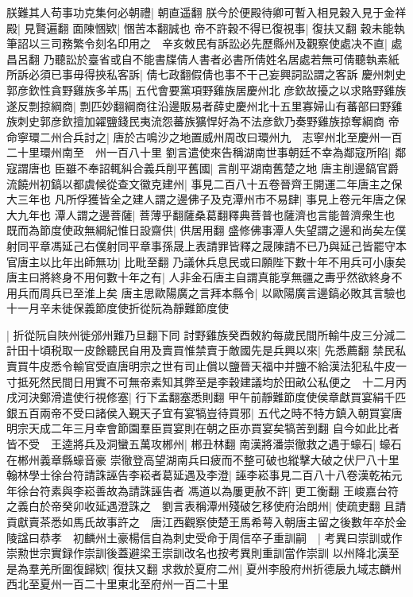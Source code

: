 朕難其人苟事功克集何必朝禮|{
	朝直遥翻}
朕今於便殿待卿可暫入相見穀入見于金祥殿|{
	見賢遍翻}
面陳悃欵|{
	悃苦本翻誠也}
帝不許穀不得已復視事|{
	復扶又翻}
穀未能執筆詔以三司務繁令刻名印用之　辛亥敇民有訴訟必先歷縣州及觀察使處决不直|{
	處昌呂翻}
乃聽訟於臺省或自不能書牒倩人書者必書所倩姓名居處若無可倩聽執素紙所訴必須已事毋得挾私客訴|{
	倩七政翻假倩也事不干己妄興詞訟謂之客訴}
慶州刺史郭彦欽性貪野雞族多羊馬|{
	五代會要黨項野雞族居慶州北}
彦欽故擾之以求賂野雞族遂反剽掠綱商|{
	剽匹妙翻綱商往沿邊販易者薛史慶州北十五里寡婦山有蕃部曰野雞族刺史郭彦欽擅加糴鹽錢民夷流怨蕃族獷悍好為不法彦欽乃奏野雞族掠奪綱商}
帝命寧環二州合兵討之|{
	唐於古鳴沙之地置威州周改曰環州九　志寧州北至慶州一百二十里環州南至　州一百八十里}
劉言遣使來告稱湖南世事朝廷不幸為鄰寇所陷|{
	鄰寇謂唐也}
臣雖不奉詔輒糾合義兵削平舊國|{
	言削平湖南舊楚之地}
唐主削邊鎬官爵流饒州初鎬以都虞候從查文徽克建州|{
	事見二百八十五卷晉齊王開運二年唐主之保大三年也}
凡所俘獲皆全之建人謂之邊佛子及克潭州市不易肆|{
	事見上卷元年唐之保大九年也}
潭人謂之邊菩薩|{
	菩薄乎翻薩桑葛翻釋典菩普也薩濟也言能普濟衆生也}
既而為節度使政無綱紀惟日設齋供|{
	供居用翻}
盛修佛事潭人失望謂之邊和尚矣左僕射同平章馮延己右僕射同平章事孫晟上表請罪皆釋之晟陳請不已乃與延己皆罷守本官唐主以比年出師無功|{
	比毗至翻}
乃議休兵息民或曰願陛下數十年不用兵可小康矣唐主曰將終身不用何數十年之有|{
	人非金石唐主自謂真能享無疆之夀乎然欲終身不用兵而周兵已至淮上矣}
唐主思歐陽廣之言拜本縣令|{
	以歐陽廣言邊鎬必敗其言驗也}
十一月辛未徙保義節度使折從阮為靜難節度使

|{
	折從阮自陜州徙邠州難乃旦翻下同}
討野雞族癸酉敇約每歲民間所輸牛皮三分減二計田十頃税取一皮餘聽民自用及賣買惟禁賣于敵國先是兵興以來|{
	先悉薦翻}
禁民私賣買牛皮悉令輸官受直唐明宗之世有司止償以鹽晉天福中并鹽不給漢法犯私牛皮一寸抵死然民間日用實不可無帝素知其弊至是李穀建議均於田畝公私便之　十二月丙戌河決鄭滑遣使行視修塞|{
	行下孟翻塞悉則翻}
甲午前靜難節度使侯章獻買宴絹千匹銀五百兩帝不受曰諸侯入覲天子宜有宴犒豈待買邪|{
	五代之時不特方鎮入朝買宴唐明宗天成二年三月幸會節園羣臣買宴則在朝之臣亦買宴矣犒苦到翻}
自今如此比者皆不受　王逵將兵及洞蠻五萬攻郴州|{
	郴丑林翻}
南漢將潘崇徹救之遇于蠔石|{
	蠔石在郴州義章縣蠔音豪}
崇徹登高望湖南兵曰疲而不整可破也縱擊大破之伏尸八十里　翰林學士徐台符請誅誣告李崧者葛延遇及李澄|{
	誣李崧事見二百八十八卷漢乾祐元年徐台符素與李崧善故為請誅誣告者}
馮道以為屢更赦不許|{
	更工衡翻}
王峻嘉台符之義白於帝癸卯收延遇澄誅之　劉言表稱潭州殘破乞移使府治朗州|{
	使疏吏翻}
且請貢獻賣茶悉如馬氏故事許之　唐江西觀察使楚王馬希萼入朝唐主留之後數年卒於金陵諡曰恭孝　初麟州土豪楊信自為刺史受命于周信卒子重訓嗣　|{
	考異曰崇訓或作崇勲世宗實録作崇訓後蓋避梁王崇訓改名也按考異則重訓當作崇訓}
以州降北漢至是為羣羌所圍復歸欵|{
	復扶又翻}
求救於夏府二州|{
	夏州李殷府州折德扆九域志麟州西北至夏州一百二十里東北至府州一百二十里}



